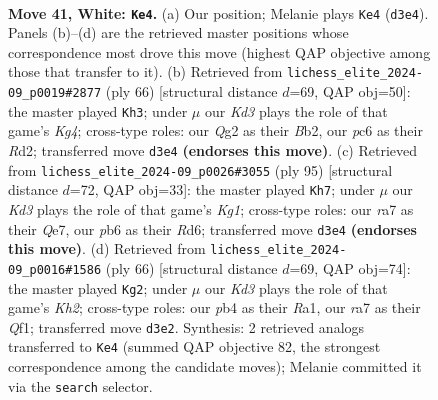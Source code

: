 \documentclass[11pt]{article}
\begin{document}
\clearpage

\begin{figure}[p]\centering
\begin{subfigure}{0.46\textwidth}\centering
\resizebox{\linewidth}{!}{%
\newchessgame
\chessboard[
  setfen={7r/r3k3/1pp3p1/4p1p1/Pp1P4/1q1KP3/R5Q1/2B5 w - - 2 41},
  showmover=false,
  pgfstyle=straightmove, color=movearrow, markmove={d3-e4}
]}
\caption{}
\end{subfigure}\hfill
\begin{subfigure}{0.46\textwidth}\centering
\resizebox{\linewidth}{!}{%
\newchessgame
\chessboard[
  setfen={r7/p4ppk/8/Q1p4p/4P1K1/P5P1/1B1R1q1P/8 w - - 0 34},
  showmover=false,
  pgfstyle=straightmove, color=movearrow, markmove={g4-h3}
]}
\caption{}
\end{subfigure}
\\[4pt]
\begin{subfigure}{0.46\textwidth}\centering
\resizebox{\linewidth}{!}{%
\newchessgame
\chessboard[
  setfen={Q5k1/4q1p1/3rP2p/1p5P/pP1n4/4R3/1P3PPK/8 b - - 2 48},
  showmover=false,
  pgfstyle=straightmove, color=movearrow, markmove={g8-h7}
]}
\caption{}
\end{subfigure}\hfill
\begin{subfigure}{0.46\textwidth}\centering
\resizebox{\linewidth}{!}{%
\newchessgame
\chessboard[
  setfen={4r1k1/6p1/2p4p/3p1P2/PP1B1q2/2P4P/5p1K/R4Q2 w - - 1 34},
  showmover=false,
  pgfstyle=straightmove, color=movearrow, markmove={h2-g2}
]}
\caption{}
\end{subfigure}
\caption{\textbf{Move 41, White: \texttt{Ke4}.} (a) Our position; Melanie plays \texttt{Ke4} (\texttt{d3e4}). Panels (b)--(d) are the retrieved master positions whose correspondence most drove this move (highest QAP objective among those that transfer to it). (b) Retrieved from \texttt{lichess\_elite\_2024-09\_p0019\#2877} (ply 66) [structural distance $d$=69, QAP obj=50]: the master played \texttt{Kh3}; under $\mu$ our \emph{Kd3} plays the role of that game's \emph{Kg4}; cross-type roles: our \emph{Q}g2 as their \emph{B}b2, our \emph{p}c6 as their \emph{R}d2; transferred move \texttt{d3e4} \textbf{(endorses this move)}. (c) Retrieved from \texttt{lichess\_elite\_2024-09\_p0026\#3055} (ply 95) [structural distance $d$=72, QAP obj=33]: the master played \texttt{Kh7}; under $\mu$ our \emph{Kd3} plays the role of that game's \emph{Kg1}; cross-type roles: our \emph{r}a7 as their \emph{Q}e7, our \emph{p}b6 as their \emph{R}d6; transferred move \texttt{d3e4} \textbf{(endorses this move)}. (d) Retrieved from \texttt{lichess\_elite\_2024-09\_p0016\#1586} (ply 66) [structural distance $d$=69, QAP obj=74]: the master played \texttt{Kg2}; under $\mu$ our \emph{Kd3} plays the role of that game's \emph{Kh2}; cross-type roles: our \emph{p}b4 as their \emph{R}a1, our \emph{r}a7 as their \emph{Q}f1; transferred move \texttt{d3e2}. Synthesis: 2 retrieved analogs transferred to \texttt{Ke4} (summed QAP objective 82, the strongest correspondence among the candidate moves); Melanie committed it via the \texttt{search} selector.}
\label{fig:thought-m80}
\end{figure}
\end{document}
